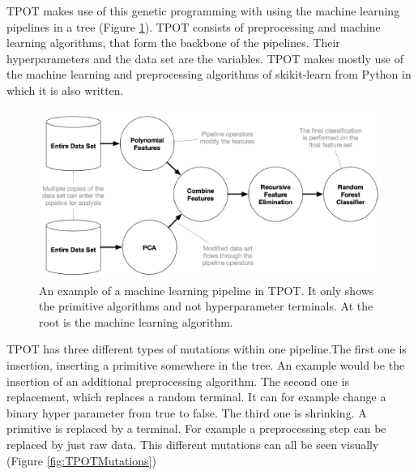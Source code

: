 \documentclass[10pt,a4paper]{article}
\begin{document}
	TPOT makes use of this genetic programming with using the machine learning pipelines in a tree (Figure \ref{fig:MachineLearningPipeline}). TPOT consists of preprocessing and machine learning algorithms, that form the backbone of the pipelines. Their hyperparameters and the data set are the variables. TPOT makes mostly use of the machine learning and preprocessing algorithms of skikit-learn from Python in which it is also written.
	
	
	
	\begin{figure}[h!]
		\includegraphics[scale=1]{MachineLearningPipeline.png}
		\caption{An example of a machine learning pipeline in TPOT. It only shows the primitive algorithms and not hyperparameter terminals. At the root is the machine learning algorithm. \cite{Gijsbers2017Thesis}}
		\label{fig:MachineLearningPipeline}
	\end{figure}

	TPOT has three different types of mutations within one pipeline.The first one is insertion, inserting a primitive somewhere in the tree. An example would be the insertion of an additional preprocessing algorithm. The second one is replacement, which replaces a random terminal. It can for example change a binary hyper parameter from true to false. The third one is shrinking. A primitive is replaced by a terminal. For example a preprocessing step can be replaced by just raw data. This different mutations can all be seen visually (Figure \ref{fig:TPOTMutations})
	
\end{document}
